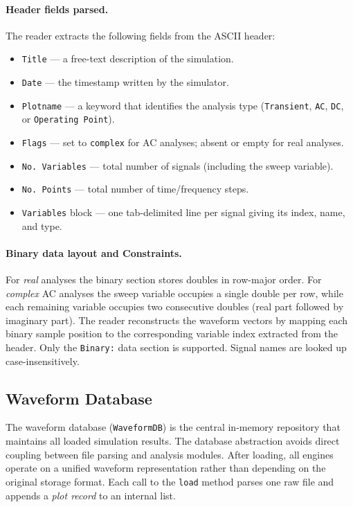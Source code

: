 \paragraph{Header fields parsed.}
The reader extracts the following fields from the ASCII header:
\begin{itemize}
  \item \texttt{Title} --- a free-text description of the simulation.
  \item \texttt{Date} --- the timestamp written by the simulator.
  \item \texttt{Plotname} --- a keyword that identifies the analysis type (\texttt{Transient}, \texttt{AC}, \texttt{DC}, or \texttt{Operating Point}).
  \item \texttt{Flags} --- set to \texttt{complex} for AC analyses; absent or empty for real analyses.
  \item \texttt{No.\ Variables} --- total number of signals (including the sweep variable).
  \item \texttt{No.\ Points} --- total number of time/frequency steps.
  \item \texttt{Variables} block --- one tab-delimited line per signal giving its index, name, and type.
\end{itemize}

\paragraph{Binary data layout and Constraints.}
For \emph{real} analyses the binary section stores doubles in row-major order. For \emph{complex} AC analyses the sweep variable occupies a single double per row, while each remaining variable occupies two consecutive doubles (real part followed by imaginary part). The reader reconstructs the waveform vectors by mapping each binary sample position to the corresponding variable index extracted from the header. Only the \texttt{Binary:} data section is supported. Signal names are looked up case-insensitively.

\subsection{Waveform Database}
\label{subsec:waveform-db}

The waveform database (\texttt{WaveformDB}) is the central in-memory repository that maintains all loaded simulation results. The database abstraction avoids direct coupling between file parsing and analysis modules. After loading, all engines operate on a unified waveform representation rather than depending on the original storage format. Each call to the \texttt{load} method parses one raw file and appends a \emph{plot record} to an internal list.

